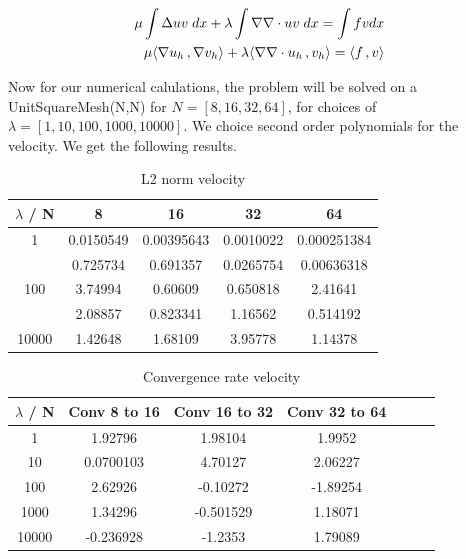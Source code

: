 \documentclass[a4paper,norsk]{article}
\begin{document}
\begin{align*}
\mu \int \Delta u v \hspace{1mm} dx + \lambda \int \nabla \nabla \cdot u v \hspace{1mm} dx = \int f v dx\\
\mu \langle \nabla u_h \,, \nabla v_h \rangle + \lambda \langle \nabla \nabla \cdot u_h \,, v_h \rangle
= \langle f \,, v \rangle
\end{align*}

Now for our numerical calulations, the problem will be solved on a UnitSquareMesh(N,N) for $N = [8, 16, 32, 64]$, for
choices of $\lambda = [1, 10, 100, 1000, 10000]$. We choice second order polynomials for the velocity. We get the following
results.

\begin{table}[ht]
\caption {L2 norm velocity}
\centering
\begin{tabular}{c|cccc}
\hline
\rowcolor{LightCyan}
$\lambda$ / N  & 8 & 16 & 32 & 64\\
\hline
1     & 0.0150549 & 0.00395643 & 0.0010022 & 0.000251384 \\ \hline
\rowcolor{LightCyan} \hline
10    & 0.725734  & 0.691357   & 0.0265754 & 0.00636318  \\ \hline
100   & 3.74994   & 0.60609    & 0.650818  & 2.41641     \\ \hline
\rowcolor{LightCyan} \hline
1000  & 2.08857   & 0.823341   & 1.16562   & 0.514192    \\ \hline
10000 & 1.42648   & 1.68109    & 3.95778   & 1.14378   \\
\hline
\end{tabular}
\end{table}

\begin{table}[ht]
\caption {Convergence rate velocity}
\centering
\begin{tabular}{c|cccccc}
\hline
\rowcolor{LightCyan}
$\lambda$ / N  & Conv 8 to 16  &  Conv 16 to 32 &  Conv 32 to 64\\
\hline
1     & 1.92796   & 1.98104   & 1.9952   &  \\ \hline
10    & 0.0700103 & 4.70127   & 2.06227  &  \\ \hline
100   & 2.62926   & -0.10272  & -1.89254 &  \\ \hline
1000  & 1.34296   & -0.501529 & 1.18071  &  \\ \hline
10000 & -0.236928 & -1.2353   & 1.79089  & \\ \hline
\end{tabular}
\end{table}
\end{document}
